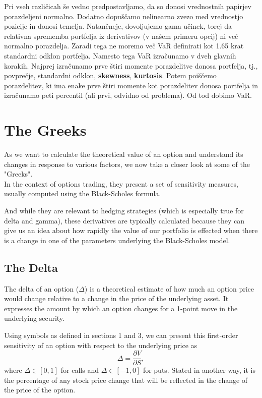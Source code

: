 \documentclass[a4paper, 12pt]{article}
\theoremstyle{definition}
\theoremstyle{plain}
\begin{document}
Pri vseh različicah še vedno predpostavljamo, da so donosi vrednostnih papirjev porazdeljeni normalno. 
Dodatno dopuščamo nelinearno zvezo med vrednostjo pozicije in donosi temelja. Natančneje, dovoljujemo gama učinek,
torej da relativna sprememba portfelja iz derivativov (v našem primeru opcij) ni več normalno porazdelja. 
Zaradi tega ne moremo več VaR definirati kot 1.65 krat standardni odklon portfelja. Namesto tega VaR 
izračunamo v dveh glavnih korakih. Najprej izračunamo prve štiri momente porazdelitve donosa portfelja, tj.,
povprečje, standardni odklon, \textbf{skewness}, \textbf{kurtosis}. Potem poiščemo 
porazdelitev, ki ima enake prve štiri momente kot porazdelitev donosa portfelja in izračunamo peti 
percentil (ali prvi, odvidno od problema). Od tod dobimo VaR.
\newpage

\section{The Greeks}


As we want to calculate the theoretical value of an 
option and understand its changes in response to 
various factors, we now take a closer look at some of the 
"Greeks". \\

In the context of options trading, they present a 
set of sensitivity measures, usually computed 
using the Black-Scholes formula. 

And while they are relevant to hedging strategies 
(which is especially true for delta and gamma),
these derivatives are typically calculated because 
they can give us an idea about how rapidly 
the value of our portfolio is effected when there is a 
change in one of the parameters underlying the 
Black-Scholes model.



\subsection{The Delta}

The delta of an option ($\Delta$) 
is a theoretical estimate 
of how much an option price would change 
relative to a change in the price of the underlying asset.
It expresses the amount by which an option changes for a 1-point 
move in the underlying security.

Using symbols as defined in sections 1 and 3, 
we can present this first-order sensitivity of an option
with respect to the underlying price 
as 
$$
\Delta = \frac{\partial V}{\partial S},
$$ 
where $\Delta\in [0,1]$ for calls and $\Delta\in [-1,0]$ for puts.
Stated in another way, it is the percentage of any
stock price change that will be reflected in the change of the 
price of the option. 
\end{document}
